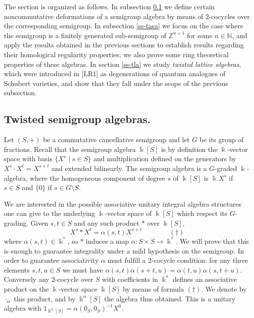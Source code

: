 \documentclass[twoside,11pt]{article}
\renewcommand{\k}{\Bbbk}
\newcommand{\N}{{\mathbb N}}
\newcommand{\Z}{{\mathbb Z}}
\begin{document}
The section is organized as follows. In subsection \ref{ss-tsa} we define certain
noncommutative deformations of a semigroup algebra by means of $2$-cocycles over the
corresponding semigroup. In subsection \ref{ss-tasa} we focus on the case where the
semigroup is a finitely generated sub-semigroup of $\Z^{n+1}$ for some $n \in \N$, and
apply the results obtained in the previous sections to establish results regarding their
homological regularity properties; we also prove some ring theoretical properties of these
algebras. In section \ref{ss-tla} we study \emph{twisted lattice algebras}, which were
introduced in [LR1] as degenerations of quantum analogues of Schubert varieties, and show
that they fall under the scope of the previous subsection. \\

\subsection{Twisted semigroup algebras.}\label{ss-tsa}
Let $(S,+)$ be a commutative cancellative semigroup and let $G$ be its group of fractions.
Recall that the semigroup algebra $\k[S]$ is by definition the $\k$-vector space with
basis $\{X^s \mid s \in S\}$ and  multiplication defined on the generators by $X^s \cdot
X^t = X^{s+t}$ and extended bilinearly. The semigroup algebra is a $G$-graded
$\k$-algebra, where the homogeneous component of degree $s$ of $\k[S]$ is $\k X^s$ if
$s\in S$ and $\{0\}$ if $s\in G\setminus S$.

We are interested in the possible associative unitary integral algebra structures one can
give to the underlying $\k$-vector space of $\k[S]$ which respect its $G$-grading. Given $s,t
\in S$ and any such product $*$ over $\k[S]$,
\[
X^s * X^t = \alpha(s,t) X^{s+t} \qquad \qquad (\dagger)
\]
where $\alpha(s,t)\in\k^*$, so $*$ induces a map $\alpha: S \times S \longrightarrow
\k^*$. We will prove that this is enough to guarantee integrality under a
mild hypothesis on the semigroup. In order to guarantee associativity $\alpha$ must
fulfill a $2$-cocycle condition: for any three elements $s, t, u \in S$ we must have 
$\alpha(s,t)\alpha(s+t,u) = \alpha(t,u) \alpha(s,t+u)$. Conversely any $2$-cocycle over
$S$ with coefficients in $\k^*$ defines an associative product on the $\k$-vector space $\k[S]$
by means of formula $(\dagger)$. We denote by $\cdot_\alpha$ this product, and by
$\k^\alpha[S]$ the algebra thus obtained. This is a unitary algebra with $1_{\k^\alpha[S]}
= \alpha(0_S,0_S)^{-1} X^0$.
\end{document}
